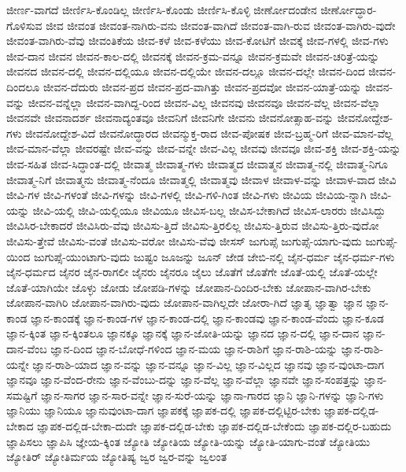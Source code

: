 {ಜೀರ್ಣ-ವಾಗದೆ
ಜೀರ್ಣಿಸಿ-ಕೊಂಡಿಲ್ಲ
ಜೀರ್ಣಿಸಿ-ಕೊಂಡು
ಜೀರ್ಣಿಸಿ-ಕೊಳ್ಳಿ
ಜೀರ್ಣೋದಂಡೇನ
ಜೀರ್ಣೋದ್ಧಾರ-ಗೊಳಿಸುವ
ಜೀವ
ಜೀವಂತ
ಜೀವಂತ-ನಾಗಿರು-ವನು
ಜೀವಂತ-ವಾಗಿದೆ
ಜೀವಂತ-ವಾಗಿ-ರುವ
ಜೀವಂತ-ವಾಗಿರು-ವುದೇ
ಜೀವಂತ-ವಾಗಿರು-ವೆವು
ಜೀವಂತಿಕೆಯ
ಜೀವ-ಕಳೆ
ಜೀವ-ಕಳೆಯು
ಜೀವ-ಕೋಟಿಗೆ
ಜೀವಕ್ಕೆ
ಜೀವ-ಗಳಲ್ಲಿ
ಜೀವ-ಗಳು
ಜೀವ-ದಾನ
ಜೀವನ
ಜೀವನ-ಕಾಲ-ದಲ್ಲಿ
ಜೀವನಕ್ಕೆ
ಜೀವನ-ಕ್ರಮ-ವನ್ನೂ
ಜೀವನ-ಕ್ರಮವೇ
ಜೀವನ-ಚರಿತ್ರೆ-ಯನ್ನು
ಜೀವನದ
ಜೀವನ-ದಲ್ಲಿ
ಜೀವನ-ದಲ್ಲಿಯೂ
ಜೀವನ-ದಲ್ಲಿಯೇ
ಜೀವನ-ದಲ್ಲೂ
ಜೀವನ-ದಲ್ಲೇ
ಜೀವನ-ದಿಂದ
ಜೀವನ-ದಿಂದಲೂ
ಜೀವನ-ದೆದುರು
ಜೀವನ-ಪ್ರದ
ಜೀವನ-ಪ್ರದ-ವಾಗಿತ್ತು
ಜೀವನ-ಪ್ರದವೋ
ಜೀವನ-ಯಾತ್ರೆ-ಯನ್ನು
ಜೀವನ-ವನ್ನು
ಜೀವನ-ವನ್ನೆಲ್ಲಾ
ಜೀವನ-ವಾಗಿದ್ದ-ರಿಂದ
ಜೀವನ-ವಿಲ್ಲ
ಜೀವನವು
ಜೀವನವೂ
ಜೀವನ-ವೆಲ್ಲ
ಜೀವನ-ವೆಲ್ಲಾ
ಜೀವನವೇ
ಜೀವನಾದರ್ಶ
ಜೀವನಾದ್ಯಂತವೂ
ಜೀವನಿಗೆ
ಜೀವನಿಗೇ
ಜೀವನು
ಜೀವನೋತ್ಸಾಹ-ವನ್ನು
ಜೀವನೋದ್ದೇಶ-ಗಳು
ಜೀವನೋದ್ದೇಶ-ವಿದೆ
ಜೀವನೋದ್ಧಾರದ
ಜೀವನ್ಮುಕ್ತ-ರಾದ
ಜೀವ-ಪೋಷಕ
ಜೀವ-ಬ್ರಹ್ಮ-ರಿಗೆ
ಜೀವ-ಮಾನ-ವೆಲ್ಲ
ಜೀವ-ಮಾನ-ವೆಲ್ಲಾ
ಜೀವರಷ್ಟೇ
ಜೀವ-ವನ್ನು
ಜೀವ-ವನ್ನೇ
ಜೀವ-ವಿಲ್ಲ
ಜೀವವು
ಜೀವವೂ
ಜೀವ-ಶಕ್ತಿ
ಜೀವ-ಶಕ್ತಿ-ಯನ್ನು
ಜೀವ-ಸಹಿತ
ಜೀವ-ಸಿದ್ಧಾಂತ-ದಲ್ಲಿ
ಜೀವಾತ್ಮ
ಜೀವಾತ್ಮ-ಗಳು
ಜೀವಾತ್ಮದ
ಜೀವಾತ್ಮನ
ಜೀವಾತ್ಮ-ನಲ್ಲಿ
ಜೀವಾತ್ಮ-ನಿಗೂ
ಜೀವಾತ್ಮ-ನಿಗೆ
ಜೀವಾತ್ಮನು
ಜೀವಾತ್ಮ-ನೆಂದೂ
ಜೀವಾತ್ಮಲ್ಲಿ
ಜೀವಾತ್ಮವು
ಜೀವಾಳ
ಜೀವಾಳ-ವನ್ನು
ಜೀವಾಳ-ವಾದ
ಜೀವಿ
ಜೀವಿ-ಗಳ
ಜೀವಿ-ಗಳಂತೆ
ಜೀವಿ-ಗಳನ್ನು
ಜೀವಿ-ಗಳಲ್ಲಿ
ಜೀವಿ-ಗಳಿ-ಗಿಂತ
ಜೀವಿ-ಗಳು
ಜೀವಿಯ
ಜೀವಿಯ-ನ್ನಾಗಿ
ಜೀವಿ-ಯನ್ನು
ಜೀವಿ-ಯಲ್ಲಿ
ಜೀವಿ-ಯಲ್ಲಿಯೂ
ಜೀವಿಯೂ
ಜೀವಿಸ-ಬಲ್ಲ
ಜೀವಿಸ-ಬೇಕಾಗಿದೆ
ಜೀವಿಸ-ಲಾರರು
ಜೀವಿಸಿದ್ದು
ಜೀವಿಸಿರ-ಬೇಕಾದರೆ
ಜೀವಿಸಿರು-ವೆವು
ಜೀವಿಸು-ತ್ತಿದೆ
ಜೀವಿಸು-ತ್ತಿರಲಿಲ್ಲ
ಜೀವಿಸು-ತ್ತಿರುವ
ಜೀವಿಸು-ತ್ತಿರು-ವುದೋ
ಜೀವಿಸು-ತ್ತೇವೆ
ಜೀವಿಸು-ವಂತೆ
ಜೀವಿಸು-ವರೋ
ಜೀವಿಸು-ವೆವು
ಜೀಸಸ್
ಜುಗುಪ್ಸೆ
ಜುಗುಪ್ಸೆ-ಯಾಗು-ವುದು
ಜುಗುಪ್ಸೆ-ಯಿಂದ
ಜುಗುಪ್ಸೆ-ಯುಂಟಾಗು-ವುದು
ಜುಷ್ಟಂ
ಜೂಜನ್ನು
ಜೂನ್
ಜೇಡ
ಜೇಬಿ-ನಲ್ಲಿ
ಜೈನ-ಧರ್ಮ
ಜೈನ-ಧರ್ಮ-ಗಳು
ಜೈನ-ಧರ್ಮದ
ಜೈನರ
ಜೈನ-ರಾಗಲೀ
ಜೈನರು
ಜೈನರೂ
ಜೈಲು
ಜೊತೆಗೆ
ಜೊತೆಗೇ
ಜೊತೆ-ಯಲ್ಲಿ
ಜೊತೆ-ಯಲ್ಲೇ
ಜೊತೆ-ಯಾಗಿಯೇ
ಜೊಳ್ಳು
ಜೋಡು
ಜೋಪಡಿ-ಗಳನ್ನು
ಜೋಪಾನ-ದಿಂದಿರ-ಬೇಕು
ಜೋಪಾನ-ವಾಗಿರ-ಬೇಕು
ಜೋಪಾನ-ವಾಗಿರಿ
ಜೋಪಾನ-ವಾಗಿರು-ವುದು
ಜೋಪಾನ-ವಾಗಿಲ್ಲದೇ
ಜೋರಾ-ಗಿದೆ
ಜ್ಞಾತೃ
ಜ್ಞಾತ್ವಾ
ಜ್ಞಾನ
ಜ್ಞಾನ-ಕಾಂಡ
ಜ್ಞಾನ-ಕಾಂಡಕ್ಕೆ
ಜ್ಞಾನ-ಕಾಂಡ-ಗಳ
ಜ್ಞಾನ-ಕಾಂಡ-ದಲ್ಲಿ
ಜ್ಞಾನ-ಕಾಂಡವು
ಜ್ಞಾನ-ಕಾಂಡ-ವೆಂದು
ಜ್ಞಾನ-ಕೂಡ
ಜ್ಞಾನ-ಕ್ಕಿಂತ
ಜ್ಞಾನ-ಕ್ಕಿಂತಲೂ
ಜ್ಞಾನಕ್ಕೂ
ಜ್ಞಾನಕ್ಕೆ
ಜ್ಞಾನ-ಜೋತಿ-ಯನ್ನು
ಜ್ಞಾನದ
ಜ್ಞಾನ-ದಲ್ಲಿ
ಜ್ಞಾನ-ದಾನ
ಜ್ಞಾನ-ದಾನ-ವೆಂಬ
ಜ್ಞಾನ-ದಿಂದ
ಜ್ಞಾನ-ಬೋಧೆ-ಗಳಿಂದ
ಜ್ಞಾನ-ಮಯ
ಜ್ಞಾನ-ರಾಶಿಗೆ
ಜ್ಞಾನ-ರಾಶಿ-ಯನ್ನು
ಜ್ಞಾನ-ರಾಶಿ-ಯನ್ನೇ
ಜ್ಞಾನ-ರಾಶಿ-ಯಾದ
ಜ್ಞಾನ-ವನ್ನು
ಜ್ಞಾನ-ವನ್ನೂ
ಜ್ಞಾನ-ವಿಲ್ಲ
ಜ್ಞಾನ-ವಿಲ್ಲದ
ಜ್ಞಾನವು
ಜ್ಞಾನ-ವುಂಟಾ-ದಾಗ
ಜ್ಞಾನವೂ
ಜ್ಞಾನ-ವೆಂದ-ರೇನು
ಜ್ಞಾನ-ವೆಂಬು-ದನ್ನು
ಜ್ಞಾನ-ವೆಲ್ಲ
ಜ್ಞಾನ-ವೆಲ್ಲಾ
ಜ್ಞಾನವೇ
ಜ್ಞಾನ-ಸಂಪತ್ತನ್ನು
ಜ್ಞಾನ-ಸಮಷ್ಟಿಗೆ
ಜ್ಞಾನ-ಸಾಗರ
ಜ್ಞಾನ-ಸಾರ-ವನ್ನೇ
ಜ್ಞಾನ-ಸುರೆ-ಯನ್ನು
ಜ್ಞಾನಾ-ಗಾರದ
ಜ್ಞಾನಿ
ಜ್ಞಾನಿ-ಗಳನ್ನು
ಜ್ಞಾನಿ-ಗಳು
ಜ್ಞಾನಿಯು
ಜ್ಞಾನಿಯೂ
ಜ್ಞಾನುವುಂಟಾ-ದಾಗ
ಜ್ಞಾಪಕಕ್ಕೆ
ಜ್ಞಾಪಕ-ದಲ್ಲಿ
ಜ್ಞಾಪಕ-ದಲ್ಲಿಟ್ಟಿರ-ಬೇಕು
ಜ್ಞಾಪಕ-ದಲ್ಲಿಡ-ಬೇಕಾದ
ಜ್ಞಾಪಕ-ದಲ್ಲಿಡ-ಬೇಕಾ-ದುದೇ
ಜ್ಞಾಪಕ-ದಲ್ಲಿಡ-ಬೇಕು
ಜ್ಞಾಪಕ-ದಲ್ಲಿಡ-ಬೇಕೆಂದು
ಜ್ಞಾಪಕ-ದಲ್ಲಿರ-ಬಹುದು
ಜ್ಞಾಪಿಸಲು
ಜ್ಞಾಪಿಸಿ
ಜ್ಞೇಯ-ಕ್ಕಿಂತ
ಜ್ಯೋತಿ
ಜ್ಯೋತಿಯ
ಜ್ಯೋತಿ-ಯನ್ನು
ಜ್ಯೋತಿ-ಯಾಗು-ವಂತೆ
ಜ್ಯೋತಿಯು
ಜ್ಯೋತಿರ್
ಜ್ಯೋತಿರ್ಮಯ
ಜ್ಯೋತಿಷ್ಯ
ಜ್ವರ
ಜ್ವರ-ವನ್ನು
ಜ್ವಲಂತ
}
